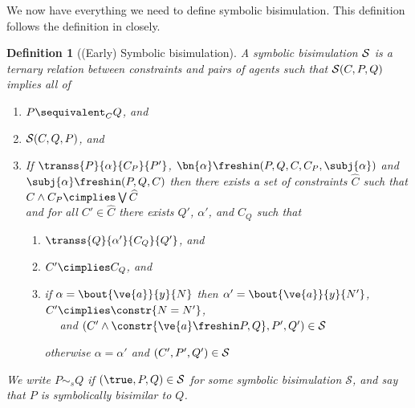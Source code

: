 \documentclass{eptcs}
\newtheorem{definition}{Definition}
\theoremstyle{definition}
\begin{document}
\begin{comment}
\begin{definition}[Equal actions]
 Two actions $\alpha_s$ and $\beta_s$ are equal for $C$, written
$\alpha_s \lequal{C} \beta_s$, is defined as
\[
\begin{array}{rcl}
 (\sigma, \Psi) \models C \wedge \ve{a} \freshin \sigma,\Psi \Longrightarrow
N\sigma = N'\sigma
&\Leftrightarrow& \sbout{y}{\ve{a}}{N} \lequal{C} \sbout{y}{\ve{a}}{N'}\\
\true &\Leftrightarrow& \lin{y}{x}{x} \lequal{C} \lin{y}{x}{x}\\
\true &\Leftrightarrow& \tau \lequal{C} \tau
\end{array}
\]
\end{definition}
\end{comment}

We now have everything we need to define symbolic bisimulation. This definition
follows the definition in \cite{hennessy.lin:symbolic-bisimulations} closely.

\begin{definition}[(Early) Symbolic bisimulation]\label{def:symbisim}
A {\em symbolic bisimulation}
 $\cal S$ is a ternary relation between constraints and pairs of agents such
that ${\cal S}(C,P,Q)$ implies all of

\begin{enumerate}
\item $P \sequivalent_C Q$, and
\item ${\cal S}(C,Q,P)$, and
\item If $\transs{P}{\alpha}{C_P}{P'}$,
$\bn{\alpha} \freshin (P,Q,C,C_P,\subj{\alpha})$ and $\subj{\alpha}
\freshin (P,Q,C)$ then there exists a set of constraints
$\widehat{C}$ such that 
$C \wedge C_P \cimplies \bigvee \widehat{C}$ \\
and for all
$C' \in \widehat{C}$ there exists $Q'$, $\alpha'$, and $C_Q$ such that

\begin{enumerate}
\item $\transs{Q}{\alpha'}{C_Q}{Q'}$, and
\item $C' \cimplies C_Q$, and
\item if $\alpha = \bout{\ve{a}}{y}{N}$ then $\alpha' =
\bout{\ve{a}}{y}{N'}$, $C' \cimplies \constr{N=N'}$, \\
$\quad$ and $(C' \wedge
\constr{\ve{a} \freshin P,Q}, P', Q') \in {\cal S}$

otherwise $\alpha = \alpha'$ and $(C', P', Q') \in {\cal S}$
\end{enumerate}
\end{enumerate}
We write $P\sim_s Q$ if $(\true, P,Q)\in\mathcal{S}$ for some symbolic
bisimulation $\mathcal{S}$, and say that $P$ is \emph{symbolically
bisimilar} to $Q$.
\end{definition}
\end{document}
